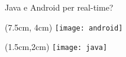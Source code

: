 \begin{frame}{Java e Android per real-time?}
	\begin{textblock*}{2cm}(7.5cm, 4cm)
		\texttt{[image: android]}
	\end{textblock*}

	\begin{textblock*}{2cm}(1.5cm,2cm)
		\texttt{[image: java]}
	\end{textblock*}
\end{frame}